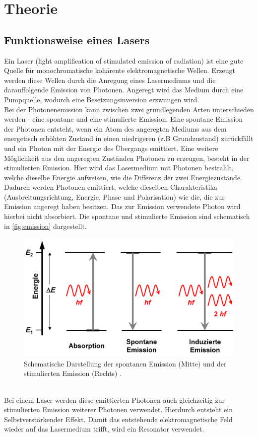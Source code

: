 \chapter{Theorie}
\label{cha:Theorie}

\section{Funktionsweise eines Lasers}

Ein Laser (light amplification of stimulated emission of radiation) ist eine gute Quelle für monochromatische kohärente 
elektromagnetische Wellen. Erzeugt werden diese Wellen durch die Anregung eines Lasermediums und die darauffolgende Emission
von Photonen. Angeregt wird das Medium durch eine Pumpquelle, wodurch eine Besetzungsinversion erzwungen wird.\\
Bei der Photonenemission kann zwischen zwei grundlegenden Arten unterschieden werden - eine spontane und eine stimulierte
Emission. Eine spontane Emission der 
Photonen entsteht, wenn ein Atom des angeregten Mediums aus dem energetisch erhöhten Zustand in einen niedrigeren (z.B Grundzustand) zurückfällt und 
ein Photon mit der Energie des Übergangs emittiert. 
Eine weitere Möglichkeit aus den angeregten Zuständen Photonen zu erzeugen, besteht in der stimulierten Emission. Hier wird
das Lasermedium mit Photonen bestrahlt, welche dieselbe Energie aufweisen, wie die Differenz der zwei Energiezustände. Dadurch werden Photonen emittiert,
welche dieselben Charakteristika (Ausbreitungsrichtung, Energie, Phase und Polarisation) wie die, die zur Emission angeregt haben besitzen. Das zur Emission verwendete
Photon wird hierbei nicht absorbiert. Die spontane und stimulierte 
Emission sind schematisch in \autoref{fig:emission} dargestellt.
\begin{figure}
    \centering
    \includegraphics[width = \textwidth]{v61_bilder/emission.png}
    \caption{Schematische Darstellung der spontanen Emission (Mitte) und der stimulierten Emission (Rechts) \cite{Emission}.}
    \label{fig:emission}
\end{figure}
\\Bei einem Laser werden diese emittierten Photonen auch gleichzeitig zur stimulierten Emission weiterer Photonen verwendet. Hierdurch
entsteht ein Selbstverstärkender Effekt. Damit das entstehende elektromagnetische Feld wieder auf das Lasermedium trifft, wird ein Resonator verwendet.

